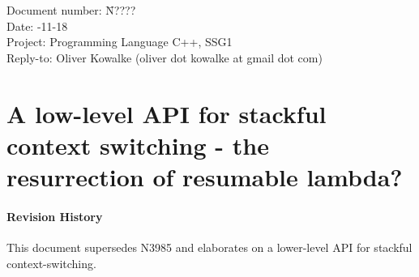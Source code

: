 \documentclass[a4paper,10pt,DIV15]{scrartcl}
\begin{document}
\small
\begin{tabbing}
    Document number: \= N????\\
    Date:            -11-18\\
    Project:         \> Programming Language C++, SSG1\\
    Reply-to:        \> Oliver Kowalke (oliver dot kowalke at gmail dot com)\\
\end{tabbing}

\section*{A low-level API for stackful context switching - the resurrection of resumable lambda?}


\tableofcontents


\paragraph*{Revision History}
This document supersedes N3985 and elaborates on a lower-level API for stackful
context-switching.












\end{document}
